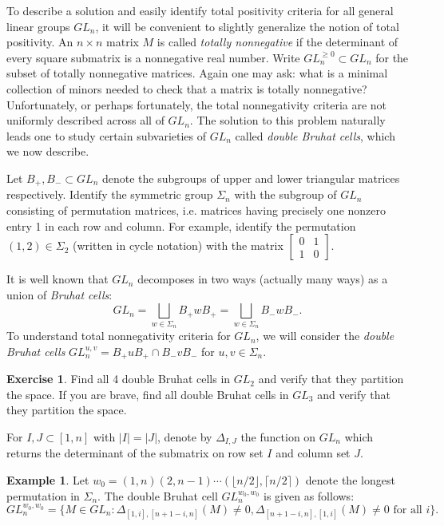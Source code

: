 \documentclass{amsart}
\theoremstyle{definition}
\newtheorem{example}[theorem]{Example}
\newtheorem{exercise}[theorem]{Exercise}
\theoremstyle{remark}
\numberwithin{equation}{section}
\begin{document}
    To describe a solution and easily identify total positivity criteria for all general linear groups $GL_n$, it will be convenient to slightly generalize the notion of total positivity.  An $n\times n$ matrix $M$ is called \emph{totally nonnegative} if the determinant of every square submatrix is a nonnegative real number.  Write $GL_n^{\ge0}\subset GL_n$ for the subset of totally nonnegative matrices.  Again one may ask: what is a minimal collection of minors needed to check that a matrix is totally nonnegative?  Unfortunately, or perhaps fortunately, the total nonnegativity criteria are not uniformly described across all of $GL_n$.  The solution to this problem naturally leads one to study certain subvarieties of $GL_n$ called \emph{double Bruhat cells}, which we now describe.

    Let $B_+,B_-\subset GL_n$ denote the subgroups of upper and lower triangular matrices respectively.  Identify the symmetric group $\Sigma_n$ with the subgroup of $GL_n$ consisting of permutation matrices, i.e. matrices having precisely one nonzero entry 1 in each row and column.  For example, identify the permutation $(1,2)\in\Sigma_2$ (written in cycle notation) with the matrix $\left[\begin{array}{cc}0 & 1\\ 1 & 0\end{array}\right]$.  

    It is well known that $GL_n$ decomposes in two ways (actually many ways) as a union of \emph{Bruhat cells}:
    \[GL_n=\bigsqcup_{w\in\Sigma_n}B_+w B_+=\bigsqcup_{w\in\Sigma_n}B_-w B_-.\]
    To understand total nonnegativity criteria for $GL_n$, we will consider the \emph{double Bruhat cells} $GL_n^{u,v}=B_+uB_+\cap B_-vB_-$ for $u,v\in\Sigma_n$.  
    \setcounter{subexercise}{2}
    \begin{exercise}
      Find all 4 double Bruhat cells in $GL_2$ and verify that they partition the space.  If you are brave, find all double Bruhat cells in $GL_3$ and verify that they partition the space.
    \end{exercise}
    For $I,J\subset[1,n]$ with $|I|=|J|$, denote by $\Delta_{I,J}$ the function on $GL_n$ which returns the determinant of the submatrix on row set $I$ and column set $J$.
    \setcounter{subexample}{1}
    \begin{example}\label{example:big cell}
      Let $w_0=(1,n)(2,n-1)\cdots(\lfloor n/2\rfloor,\lceil n/2\rceil)$ denote the longest permutation in $\Sigma_n$.  The double Bruhat cell $GL_n^{w_0,w_0}$ is given as follows:
      \[GL_n^{w_0,w_0}=\{M\in GL_n:\Delta_{[1,i],[n+1-i,n]}(M)\ne0,\Delta_{[n+1-i,n],[1,i]}(M)\ne0\text{ for all $i$}\}.\]
    \end{example}
\end{document}
